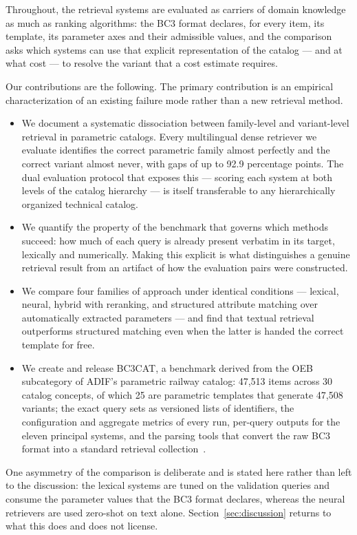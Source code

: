 \documentclass[preprint,review,12pt]{elsarticle}
\begin{document}
Throughout, the retrieval systems are evaluated as carriers of domain knowledge as much as ranking algorithms: the BC3 format declares, for every item, its template, its parameter axes and their admissible values, and the comparison asks which systems can use that explicit representation of the catalog --- and at what cost --- to resolve the variant that a cost estimate requires.

Our contributions are the following. The primary contribution is an empirical characterization of an existing failure mode rather than a new retrieval method.

\begin{itemize}
    \item We document a systematic dissociation between family-level and variant-level retrieval in parametric catalogs. Every multilingual dense retriever we evaluate identifies the correct parametric family almost perfectly and the correct variant almost never, with gaps of up to 92.9 percentage points. The dual evaluation protocol that exposes this --- scoring each system at both levels of the catalog hierarchy --- is itself transferable to any hierarchically organized technical catalog.
    \item We quantify the property of the benchmark that governs which methods succeed: how much of each query is already present verbatim in its target, lexically and numerically. Making this explicit is what distinguishes a genuine retrieval result from an artifact of how the evaluation pairs were constructed.
    \item We compare four families of approach under identical conditions --- lexical, neural, hybrid with reranking, and structured attribute matching over automatically extracted parameters --- and find that textual retrieval outperforms structured matching even when the latter is handed the correct template for free.
    \item We create and release BC3CAT, a benchmark derived from the OEB subcategory of ADIF's parametric railway catalog: 47,513 items across 30 catalog concepts, of which 25 are parametric templates that generate 47,508 variants; the exact query sets as versioned lists of identifiers, the configuration and aggregate metrics of every run, per-query outputs for the eleven principal systems, and the parsing tools that convert the raw BC3 format into a standard retrieval collection~\cite{bc3cat_dataset}.
\end{itemize}

One asymmetry of the comparison is deliberate and is stated here rather than left to the discussion: the lexical systems are tuned on the validation queries and consume the parameter values that the BC3 format declares, whereas the neural retrievers are used zero-shot on text alone. Section~\ref{sec:discussion} returns to what this does and does not license.
\end{document}
